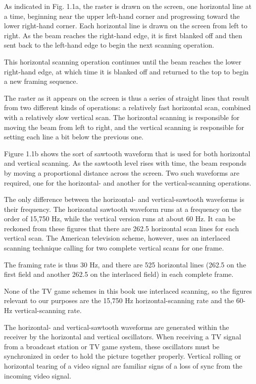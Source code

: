 \documentclass[11pt]{book}              %
\begin{document}
As indicated in Fig. 1.1a, the raster is drawn on the screen, one horizontal line at a time, beginning near the upper left-hand corner and progressing toward the lower right-hand corner. Each horizontal line is drawn on the screen from left to right. As the beam reaches the right-hand edge, it is first blanked off and then sent back to the left-hand edge to begin the next scanning operation.

This horizontal scanning operation continues until the beam reaches the lower right-hand edge, at which time it is blanked off and returned to the top to begin a new framing sequence.

The raster as it appears on the screen is thus a series of straight lines that result from two different kinds of operations: a relatively fast horizontal scan, combined with a relatively slow vertical scan. The horizontal scanning is responsible for moving the beam from left to right, and the vertical scanning is responsible for setting each line a bit below the previous one.

Figure 1.1b shows the sort of sawtooth waveform that is used for both horizontal and vertical scanning. As the sawtooth level rises with time, the beam responds by moving a proportional distance across the screen. Two such waveforms are required, one for the horizontal- and another for the vertical-scanning operations.

The only difference between the horizontal- and vertical-sawtooth waveforms is their frequency. The horizontal sawtooth waveform runs at a frequency on the order of 15,750 Hz, while the vertical version runs at about 60 Hz. It can be reckoned from these figures that there are 262.5 horizontal scan lines for each vertical scan. The American television scheme, however, uses an interlaced scanning technique calling for two complete vertical scans for one frame.

The framing rate is thus 30 Hz, and there are 525 horizontal lines (262.5 on the first field and another 262.5 on the interlaced field) in each complete frame.

None of the TV game schemes in this book use interlaced scanning, so the figures relevant to our purposes are the 15,750 Hz horizontal-scanning rate and the 60-Hz vertical-scanning rate.

The horizontal- and vertical-sawtooth waveforms are generated within the receiver by the horizontal and vertical oscillators. When receiving a TV signal from a broadcast station or TV game system, these oscillators must be synchronized in order to hold the picture together properly. Vertical rolling or horizontal tearing of a video signal are familiar signs of a loss of sync from the incoming video signal.
\end{document}
